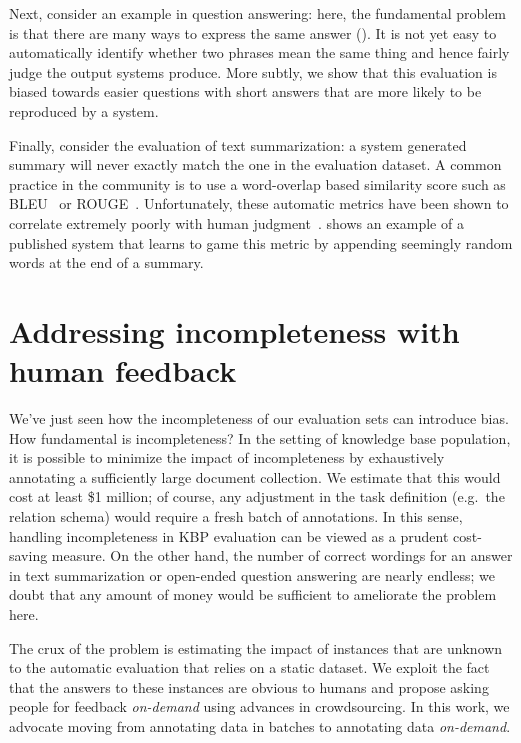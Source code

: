 Next, consider an example in question answering:
  here, the fundamental problem is that there are many ways to express the same answer ().
It is not yet easy to automatically identify whether two phrases mean the same thing and hence fairly judge the output systems produce.
More subtly, we show that this evaluation is biased towards easier questions with short answers that are more likely to be reproduced by a system.

Finally, consider the evaluation of text summarization: a system generated summary will never exactly match the one in the evaluation dataset.
A common practice in the community is to use a word-overlap based similarity score such as BLEU~\citep{papineni02bleu} or ROUGE~\citep{lin2004rouge}\@.
Unfortunately, these automatic metrics have been shown to correlate extremely poorly with human judgment~\citep{novikova2017why}.
 shows an example of a published system that learns to game this metric by appending seemingly random words at the end of a summary.

\section{Addressing incompleteness with human feedback}
We've just seen how the incompleteness of our evaluation sets can introduce bias.
How fundamental is incompleteness?
In the setting of knowledge base population, it is possible to minimize the impact of incompleteness by exhaustively annotating a sufficiently large document collection.
We estimate that this would cost at least \$1 million; of course, any adjustment in the task definition (e.g.\ the relation schema) would require a fresh batch of annotations.
In this sense, handling incompleteness in KBP evaluation can be viewed as a prudent cost-saving measure.
On the other hand, the number of correct wordings for an answer in text summarization or open-ended question answering are nearly endless; we doubt that any amount of money would be sufficient to ameliorate the problem here.

The crux of the problem is estimating the impact of instances that are unknown to the automatic evaluation that relies on a static dataset.
We exploit the fact that the answers to these instances are obvious to humans and propose asking people for feedback \textit{on-demand} using advances in crowdsourcing. %
In this work, we advocate moving from annotating data in batches to annotating data \textit{on-demand}.

